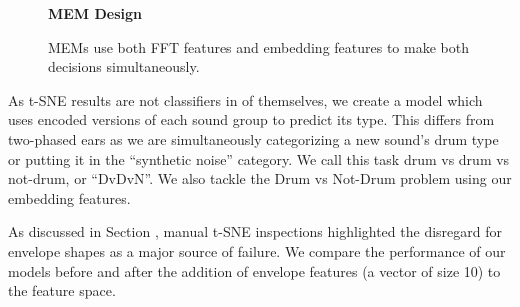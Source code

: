 \documentclass[\main/thesis.tex]{subfiles}
\begin{document}
\begin{figure}[t!]
    \begin{center}
    \textbf{MEM Design}
    \end{center}
    \caption{MEMs use both FFT features and embedding features to make both decisions simultaneously. }
\label{fig:TPE_design}
\end{figure}
\label{chap3:mixed_ear_models}
As t-SNE results are not classifiers in of themselves, we create a model which uses encoded versions of each sound group to predict its type. This differs from two-phased ears as we are simultaneously categorizing a new sound's drum type or putting it in the \enquote{synthetic noise} category. We call this task drum vs drum vs not-drum, or \enquote{DvDvN}. We also tackle the Drum vs Not-Drum problem using our embedding features.

As discussed in Section \label{fig:embedding_FE}, manual t-SNE inspections highlighted the disregard for envelope shapes as a major source of failure. We compare the performance of our models before and after the addition of envelope features (a vector of size 10) to the feature space. 
\end{document}
